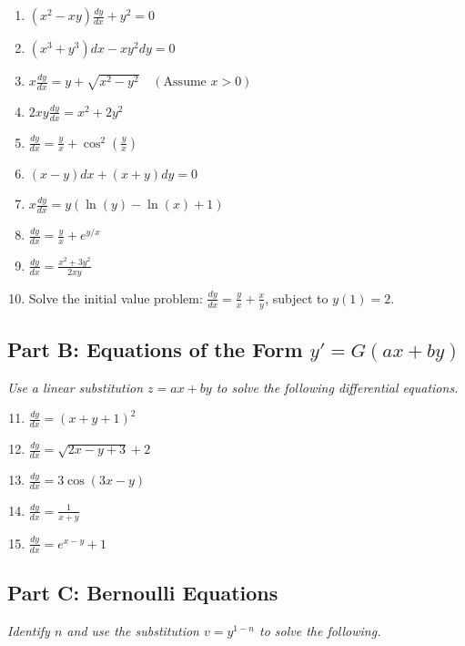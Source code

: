 \documentclass[12pt]{article}
\begin{document}
\begin{enumerate}
    \item $(x^2 - xy)\frac{dy}{dx} + y^2 = 0$
    \item $(x^3 + y^3)dx - xy^2 dy = 0$
    \item $x \frac{dy}{dx} = y + \sqrt{x^2 - y^2} \quad (\text{Assume } x > 0)$
    \item $2xy \frac{dy}{dx} = x^2 + 2y^2$
    \item $\frac{dy}{dx} = \frac{y}{x} + \cos^2\left(\frac{y}{x}\right)$
    \item $(x-y)dx + (x+y)dy = 0$
    \item $x \frac{dy}{dx} = y(\ln(y) - \ln(x) + 1)$
    \item $\frac{dy}{dx} = \frac{y}{x} + e^{y/x}$
    \item $\frac{dy}{dx} = \frac{x^2 + 3y^2}{2xy}$
    \item Solve the initial value problem: $\frac{dy}{dx} = \frac{y}{x} + \frac{x}{y}$, subject to $y(1) = 2$.
\end{enumerate}

\subsection*{Part B: Equations of the Form $y' = G(ax+by)$}
\textit{Use a linear substitution $z = ax+by$ to solve the following differential equations.}

\begin{enumerate}
    \setcounter{enumi}{10}
    \item $\frac{dy}{dx} = (x+y+1)^2$
    \item $\frac{dy}{dx} = \sqrt{2x - y + 3} + 2$
    \item $\frac{dy}{dx} = 3\cos(3x-y)$
    \item $\frac{dy}{dx} = \frac{1}{x+y}$
    \item $\frac{dy}{dx} = e^{x-y} + 1$
\end{enumerate}

\subsection*{Part C: Bernoulli Equations}
\textit{Identify $n$ and use the substitution $v = y^{1-n}$ to solve the following.}
\end{document}
